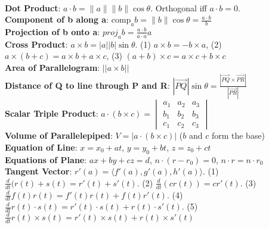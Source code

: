 \documentclass{article}
\begin{document}
\singlespacing

\titlespacing*{\subsubsection}{0pt}{0pt}{0pt}

\pagestyle{fancy}
\fancyhf{}
\renewcommand{\headrulewidth}{0pt}

\setlength{\columnseprule}{0.2pt} %

\footnotesize{
\begin{multicols*}{3}
\vphantom{}\\
\textbf{Dot Product}: $a\cdot b=\parallel a\parallel \parallel b \parallel \cos\theta$. Orthogonal iff $a\cdot b=0$.\\
\textbf{Component of b along a}: $\text{comp}_ab=\parallel b\parallel\cos\theta=\frac{a\cdot b}{b}$ \\
\textbf{Projection of b onto a}: $proj_{a}b=\frac{a\cdot b}{a\cdot a}a$\\
\textbf{Cross Product}: $a\times b=|a||b|\sin\theta$. (1) $a\times b=-b\times a$, (2) $a\times(b+c)=a\times b+a\times c$, (3) $(a+b)\times c=a\times c+b\times c$\\
\textbf{Area of Parallelogram}: $||a\times b||$\\
\textbf{Distance of Q to line through P and R}: $|\vec{PQ}|\sin\theta=\frac{|\vec{PQ}\times\vec{PR}|}{|\vec{PR}|}$\\
\textbf{Scalar Triple Product}: $a\cdot (b\times c)=\begin{vmatrix}
    a_1 & a_2 & a_3 \\
    b_1 & b_2 & b_3 \\
    c_1 & c_2 & c_3
\end{vmatrix}$\\
\textbf{Volume of Parallelepiped}: $V=|a\cdot(b\times c)|$ ($b$ and $c$ form the base)\\
\textbf{Equation of Line}: $x=x_0+at$, $y=y_0+bt$, $z=z_0+ct$\\
\textbf{Equations of Plane}: $ax+by+cz=d$, $n\cdot(r-r_0)=0$, $n\cdot r=n\cdot r_0$\\
\textbf{Tangent Vector}: $r'(a)=\langle f'(a),g'(a),h'(a)\rangle$. (1) $\frac{d}{dt}(r(t)+s(t)=r'(t)+s'(t)$. (2) $\frac{d}{dt}(cr(t))=cr'(t)$. (3) $\frac{d}{dt}f(t)r(t)=f'(t)r(t)+f(t)r'(t)$. (4) $\frac{d}{dt}r(t)\cdot s(t)=r'(t)\cdot s(t)+r(t)\cdot s'(t)$. (5) $\frac{d}{dt}r(t)\times s(t)=r'(t)\times s(t)+r(t)\times s'(t)$ \\

\end{multicols*}}
\end{document}
